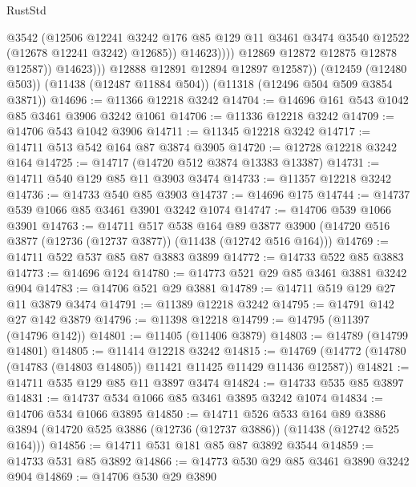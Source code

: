 \begin{lexlean}{RustStd}
\begin{coremodule}
                            @3542
                            (@12506
                              @12241
                              @3242
                              @176
                              @85
                              @129
                              @11
                              @3461
                              @3474
                              @3540
                              @12522
                              (@12678 @12241 @3242)
                              @12685))
                          @14623))))
                  @12869
                  @12872
                  @12875
                  @12878
                  @12587))
              @14623)))
        @12888
        @12891
        @12894
        @12897
        @12587))
    (@12459 (@12480 @503))
    (@11438 (@12487 @11884 @504))
    (@11318 (@12496 @504 @509 @3854 @3871))
@14696 := @11366 @12218 @3242
@14704 := @14696 @161 @543 @1042 @85 @3461 @3906 @3242 @1061
@14706 := @11336 @12218 @3242
@14709 := @14706 @543 @1042 @3906
@14711 := @11345 @12218 @3242
@14717 := @14711 @513 @542 @164 @87 @3874 @3905
@14720 := @12728 @12218 @3242 @164
@14725 := @14717 (@14720 @512 @3874 @13383 @13387)
@14731 := @14711 @540 @129 @85 @11 @3903 @3474
@14733 := @11357 @12218 @3242
@14736 := @14733 @540 @85 @3903
@14737 := @14696 @175
@14744 := @14737 @539 @1066 @85 @3461 @3901 @3242 @1074
@14747 := @14706 @539 @1066 @3901
@14763 := @14711
    @517
    @538
    @164
    @89
    @3877
    @3900
    (@14720 @516 @3877 (@12736 (@12737 @3877)) (@11438 (@12742 @516 @164)))
@14769 := @14711 @522 @537 @85 @87 @3883 @3899
@14772 := @14733 @522 @85 @3883
@14773 := @14696 @124
@14780 := @14773 @521 @29 @85 @3461 @3881 @3242 @904
@14783 := @14706 @521 @29 @3881
@14789 := @14711 @519 @129 @27 @11 @3879 @3474
@14791 := @11389 @12218 @3242
@14795 := @14791 @142 @27 @142 @3879
@14796 := @11398 @12218
@14799 := @14795 (@11397 (@14796 @142))
@14801 := @11405 (@11406 @3879)
@14803 := @14789 (@14799 @14801)
@14805 := @11414 @12218 @3242
@14815 := @14769 (@14772 (@14780 (@14783 (@14803 @14805)) @11421 @11425 @11429 @11436 @12587))
@14821 := @14711 @535 @129 @85 @11 @3897 @3474
@14824 := @14733 @535 @85 @3897
@14831 := @14737 @534 @1066 @85 @3461 @3895 @3242 @1074
@14834 := @14706 @534 @1066 @3895
@14850 := @14711
    @526
    @533
    @164
    @89
    @3886
    @3894
    (@14720 @525 @3886 (@12736 (@12737 @3886)) (@11438 (@12742 @525 @164)))
@14856 := @14711 @531 @181 @85 @87 @3892 @3544
@14859 := @14733 @531 @85 @3892
@14866 := @14773 @530 @29 @85 @3461 @3890 @3242 @904
@14869 := @14706 @530 @29 @3890

\end{coremodule}
\end{lexlean}
